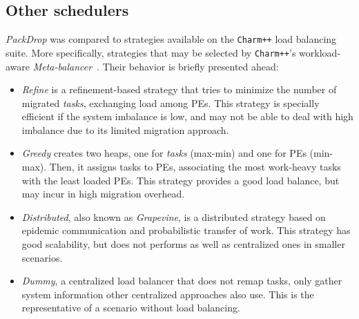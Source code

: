 \subsection{Other schedulers}

\textit{PackDrop} was compared to strategies available on the \texttt{Charm++} load balancing suite.
More specifically, strategies that may be selected by \texttt{Charm++}'s workload-aware \textit{Meta-balancer}~\cite{MenonPHD}.
Their behavior is briefly presented ahead:

\begin{itemize}
	\item \textit{Refine} is a refinement-based strategy that tries to minimize the number of migrated \textit{tasks}, exchanging load among PEs.
This strategy is specially efficient if the system imbalance is low, and may not be able to deal with high imbalance due to its limited migration approach.
	\item \textit{Greedy} creates two heaps, one for \textit{tasks} (max-min) and one for PEs (min-max). 
Then, it assigns tasks to PEs, associating the most work-heavy tasks with the least loaded PEs.
This strategy provides a good load balance, but may incur in high migration overhead.
    \item \textit{Distributed}, also known as \textit{Grapevine}, is a distributed strategy based on epidemic communication and probabilistic transfer of work.
   This strategy has good scalability, but does not performs as well as centralized ones in smaller scenarios.
   \item \textit{Dummy}, a centralized load balancer that does not remap tasks, only gather system information other centralized approaches also use.
   This is the representative of a scenario without load balancing.

\end{itemize}



